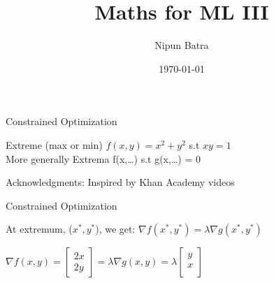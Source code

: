 \documentclass{beamer}
\title{Maths for ML III}
\date{\today}
\author{Nipun Batra}
\institute{IIT Gandhinagar}
\begin{document}
  \maketitle
  
  
  



    
    
    
    
    
    


\begin{frame}{Constrained Optimization}

Extreme (max or min) $f(x,y) = x^{2}+y^{2}$ s.t $xy=1$\\

\vspace{2em}
More generally Extrema f(x,\dots) s.t g(x,\dots) = 0

\pause Acknowledgments: Inspired by Khan Academy videos


\end{frame}

{
	
}


\begin{frame}{Constrained Optimization}

\begin{tcolorbox}
	At extremum, ($x^*, y^*$), we get: 
$\nabla f(x^*,y^*) = \lambda \nabla g(x^*,y^*)$
\end{tcolorbox}

\pause $\nabla f(x,y) = \begin{bmatrix}
2x\\
2y
\end{bmatrix}
= \lambda \nabla g(x,y)  = \lambda  \begin{bmatrix}
y\\
x\\
\end{bmatrix}$
\end{frame}
\end{document}

